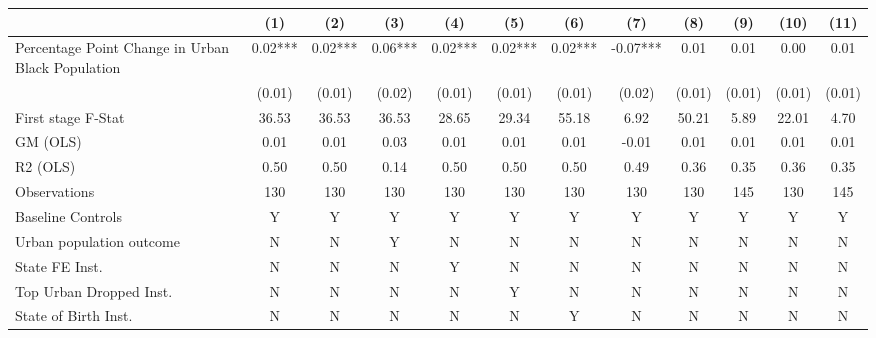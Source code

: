  \begin{tabular}{l*{11}{c}} \toprule
                    &\multicolumn{1}{c}{(1)}   &\multicolumn{1}{c}{(2)}   &\multicolumn{1}{c}{(3)}   &\multicolumn{1}{c}{(4)}   &\multicolumn{1}{c}{(5)}   &\multicolumn{1}{c}{(6)}   &\multicolumn{1}{c}{(7)}   &\multicolumn{1}{c}{(8)}   &\multicolumn{1}{c}{(9)}   &\multicolumn{1}{c}{(10)}   &\multicolumn{1}{c}{(11)}   \\
\midrule
Percentage Point Change in Urban Black Population&     0.02***&     0.02***&     0.06***&     0.02***&     0.02***&     0.02***&    -0.07***&     0.01   &     0.01   &     0.00   &     0.01   \\
                    &   (0.01)   &   (0.01)   &   (0.02)   &   (0.01)   &   (0.01)   &   (0.01)   &   (0.02)   &   (0.01)   &   (0.01)   &   (0.01)   &   (0.01)   \\
\midrule
First stage F-Stat  &    36.53   &    36.53   &    36.53   &    28.65   &    29.34   &    55.18   &     6.92   &    50.21   &     5.89   &    22.01   &     4.70   \\
GM (OLS)            &     0.01   &     0.01   &     0.03   &     0.01   &     0.01   &     0.01   &    -0.01   &     0.01   &     0.01   &     0.01   &     0.01   \\
R2 (OLS)            &     0.50   &     0.50   &     0.14   &     0.50   &     0.50   &     0.50   &     0.49   &     0.36   &     0.35   &     0.36   &     0.35   \\
Observations        &      130   &      130   &      130   &      130   &      130   &      130   &      130   &      130   &      145   &      130   &      145   \\
Baseline Controls   &        Y   &        Y   &        Y   &        Y   &        Y   &        Y   &        Y   &        Y   &        Y   &        Y   &        Y   \\
Urban population outcome&        N   &        N   &        Y   &        N   &        N   &        N   &        N   &        N   &        N   &        N   &        N   \\
State FE Inst.      &        N   &        N   &        N   &        Y   &        N   &        N   &        N   &        N   &        N   &        N   &        N   \\
Top Urban Dropped Inst.&        N   &        N   &        N   &        N   &        Y   &        N   &        N   &        N   &        N   &        N   &        N   \\
State of Birth Inst.&        N   &        N   &        N   &        N   &        N   &        Y   &        N   &        N   &        N   &        N   &        N   \\

\end{tabular}
